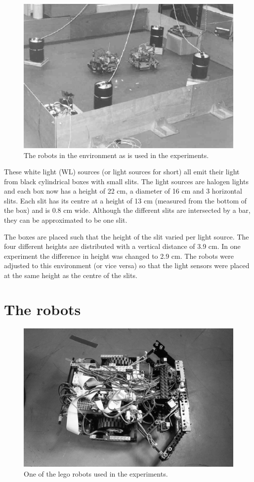 \begin{figure}[t]
\centerline{\includegraphics[width=\textwidth]{robots//environment.eps}}
\caption{The robots in the environment as is used in the experiments.}
\label{f:robots:envir}
\end{figure}


These white light (WL) sources (or light sources for short) all emit their light from black cylindrical boxes with  small slits. The light sources are halogen lights and each box now has a height of 22 cm, a diameter of 16 cm and 3 horizontal slits. Each slit has its centre at a height of 13 cm (measured from the bottom of the box) and is 0.8 cm wide. Although the different slits are intersected by a bar, they can be approximated to be one slit.

The boxes are placed such that the height of the slit varied per light source. The four different heights are distributed with a vertical distance of 3.9 cm. In one experiment the difference in height was changed to 2.9 cm. The robots were adjusted to this environment (or vice versa) so that the light sensors were placed at the same height as the centre of the slits.

\section{The robots}\label{s:robots:robots}

\begin{figure}[t]
\centerline{\includegraphics[width=12cm]{robots//robot.eps}}
\caption{One of the {\sc lego} robots used in the experiments.}
\label{f:robots}
\end{figure}

